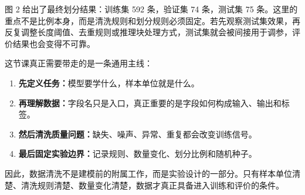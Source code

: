 \documentclass[UTF8,a4paper,12pt]{ctexart}
\begin{document}
图 2 给出了最终划分结果：训练集 592 条，验证集 74 条，测试集 75 条。这里的重点不是比例本身，而是清洗规则和划分规则必须固定。若先观察测试集效果，再反复调整长度阈值、去重规则或推理块处理方式，测试集就会被间接用于调参，评价结果也会变得不可靠。

这节课真正需要带走的是一条通用主线：

\begin{enumerate}
  \item \textbf{先定义任务：}模型要学什么，样本单位就是什么。
  \item \textbf{再理解数据：}字段名只是入口，真正重要的是字段如何构成输入、输出和标签。
  \item \textbf{然后清洗质量问题：}缺失、噪声、异常、重复都会改变训练信号。
  \item \textbf{最后固定实验边界：}记录规则、数量变化、划分比例和随机种子。
\end{enumerate}

因此，数据清洗不是建模前的附属工作，而是实验设计的一部分。只有样本单位清楚、清洗规则清楚、数量变化清楚，数据才真正具备进入训练和评价的条件。
\end{document}
